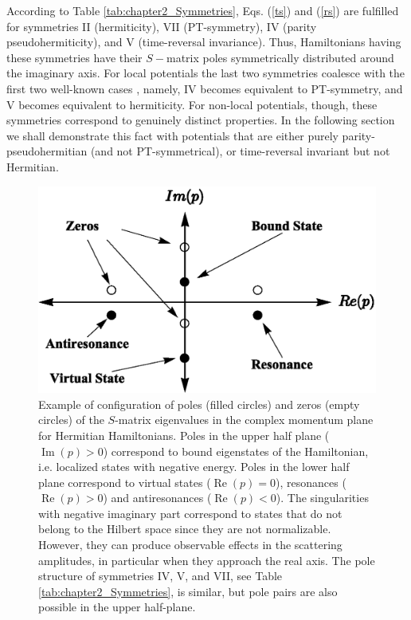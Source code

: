 According to Table \ref{tab:chapter2_Symmetries},  Eqs. (\ref{ts}) and (\ref{rs}) are fulfilled
for symmetries  II (hermiticity), VII (PT-symmetry), IV (parity pseudohermiticity),
and V (time-reversal invariance). Thus, Hamiltonians having these symmetries have their $S-$matrix poles symmetrically distributed around the imaginary axis. For local potentials the last two symmetries coalesce with the first two well-known
cases \cite{Ruschhaupt2017}, namely,
IV becomes equivalent to PT-symmetry, and V becomes equivalent to hermiticity. For non-local potentials, though, these symmetries
correspond to genuinely distinct properties. In the following section we shall demonstrate this fact with potentials that are
either purely parity-pseudohermitian (and not PT-symmetrical), or time-reversal invariant but not Hermitian.
%


\begin{figure}[h]
  \centering
  \includegraphics[width=0.5\linewidth]{Figures/DiagramPoles.eps}
  \caption{Example of configuration of poles (filled circles) and zeros (empty circles) of the $S$-matrix eigenvalues in the complex momentum plane for Hermitian Hamiltonians.  Poles in the upper half plane ($\operatorname{Im}(p) > 0$) correspond to bound eigenstates of the Hamiltonian, i.e. localized states with negative energy. Poles in the lower half plane correspond to  virtual states ($\operatorname{Re}(p) = 0$), resonances ($\operatorname{Re}(p) > 0$) and antiresonances ($\operatorname{Re}(p)<0$). The singularities with negative imaginary part correspond to states that do not belong to the Hilbert space since they are not normalizable. However, they can produce observable effects in the scattering amplitudes, in particular when they approach the real axis. The pole structure of symmetries IV, V, and VII, see Table \ref{tab:chapter2_Symmetries},
  is similar, but pole pairs are also possible in the upper half-plane.}
  \label{fig:DiagramPoles}
\end{figure}

